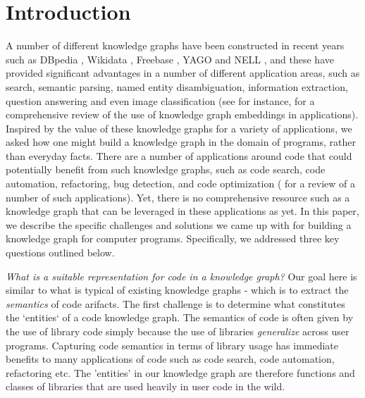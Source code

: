 \section{Introduction}
A number of different knowledge graphs have been constructed in recent years such as DBpedia \cite{dbpedia-swj}, Wikidata \cite{Vrandecic:2014:WFC:2661061.2629489}, Freebase \cite{Bollacker08freebase:a}, YAGO \cite{Suchanek:2007:YCS:1242572.1242667} and NELL \cite{Carlson:2010:TAN:2898607.2898816}, and these have provided significant advantages in a number of different application areas, such as search, semantic parsing, named entity disambiguation, information extraction, question answering and even image classification (see \cite{journals/tkde/WangMWG17} for instance, for a comprehensive review of the use of knowledge graph embeddings in applications).  Inspired by the value of these knowledge graphs for a variety of applications, we asked how one might build a knowledge graph in the domain of programs, rather than everyday facts.  There are a number of applications around code that could potentially benefit from such knowledge graphs, such as code search, code automation, refactoring, bug detection, and code optimization (\cite{Allamanis:2018:SML:3236632.3212695} for a review of a number of such applications).  Yet, there is no comprehensive resource such as a knowledge graph that can be leveraged in these applications as yet.  In this paper, we describe the specific challenges and solutions we came up with for building a knowledge graph for computer programs.  Specifically, we addressed three key questions outlined below.

\textit{What is a suitable representation for code in a knowledge graph?}
Our goal here is similar to what is typical of existing knowledge graphs - which is to extract the \textit{semantics} of code arifacts.  The first challenge is to determine what constitutes the `entities` of a code knowledge graph.  The semantics of code is often given by the use of library code simply because the use of libraries \textit{generalize} across user programs.  Capturing code semantics in terms of library usage has immediate benefits to many applications of code such as code search, code automation, refactoring etc. The 'entities' in our knowledge graph are therefore functions and classes of libraries that are used heavily in user code in the wild.  

